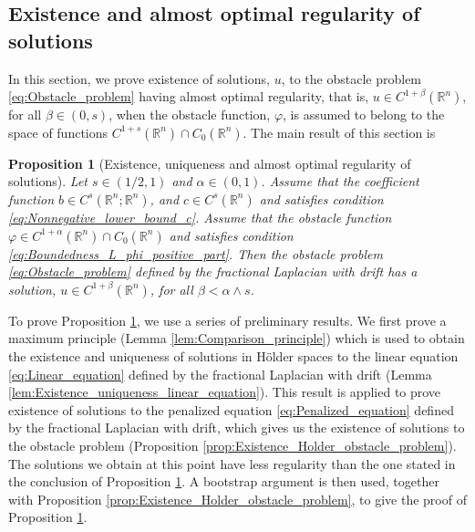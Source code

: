 \documentclass[11pt,reqno]{amsart}
\newtheorem{prop}[thm]{Proposition}
\theoremstyle{definition}
\theoremstyle{remark}
\begin{document}
\subsection{Existence and almost optimal regularity of solutions}
\label{sec:Solutions_partial_regularity}

In this section, we prove existence of solutions, $u$, to the obstacle problem \eqref{eq:Obstacle_problem} having almost optimal regularity, that is, $u \in C^{1+\beta}({\mathbb{R}}^n)$, for all $\beta \in (0,s)$, when the obstacle function, $\varphi$, is assumed to belong to the space of functions $C^{1+s}({\mathbb{R}}^n)\cap C_0({\mathbb{R}}^n)$. The main result of this section is

\begin{prop}[Existence, uniqueness and almost optimal regularity of solutions]
\label{prop:Solutions_partial_regularity}
Let $s \in (1/2,1)$ and $\alpha \in (0,1)$. Assume that the coefficient function $b \in C^{s}({\mathbb{R}}^n;{\mathbb{R}}^n)$, and $c \in C^{s}({\mathbb{R}}^n)$ and satisfies condition \eqref{eq:Nonnegative_lower_bound_c}. Assume that the obstacle function $\varphi\in C^{1+\alpha}({\mathbb{R}}^n)\cap C_0({\mathbb{R}}^n)$ and satisfies condition \eqref{eq:Boundedness_L_phi_positive_part}. Then the obstacle problem \eqref{eq:Obstacle_problem} defined by the fractional Laplacian with drift has a solution, $u \in C^{1+\beta}({\mathbb{R}}^n)$, for all $\beta<\alpha\wedge s$.
\end{prop}

To prove Proposition \ref{prop:Solutions_partial_regularity}, we use a series of preliminary results. We first prove a maximum principle (Lemma \ref{lem:Comparison_principle}) which is used to obtain the existence and uniqueness of solutions in H\"older spaces to the linear equation \eqref{eq:Linear_equation} defined by the fractional Laplacian with drift (Lemma \ref{lem:Existence_uniqueness_linear_equation}). This result is applied to prove existence of solutions to the penalized equation \eqref{eq:Penalized_equation} defined by the fractional Laplacian with drift, which gives us the existence of solutions to the obstacle problem (Proposition \ref{prop:Existence_Holder_obstacle_problem}). The solutions we obtain at this point have less regularity than the one stated in the conclusion of Proposition \ref{prop:Solutions_partial_regularity}. A bootstrap argument is then used, together with Proposition \ref{prop:Existence_Holder_obstacle_problem}, to give the proof of Proposition \ref{prop:Solutions_partial_regularity}.
\end{document}
